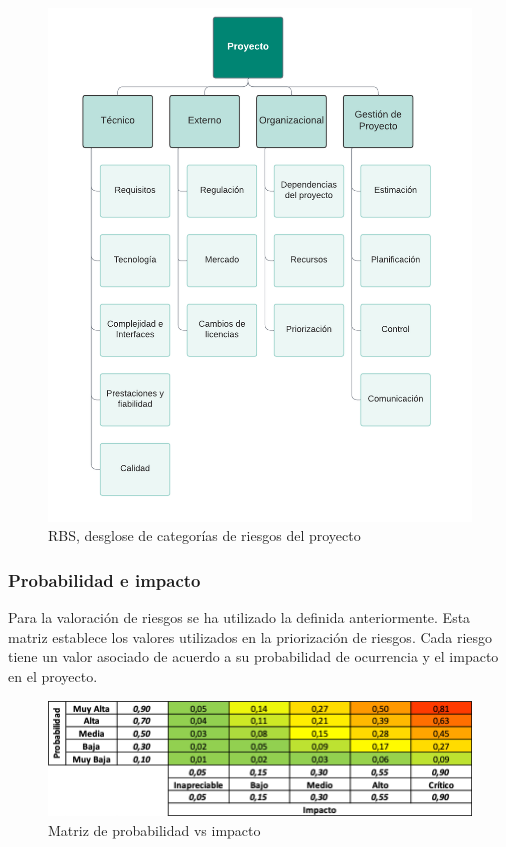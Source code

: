 \begin{figure}[H]
    \hypertarget{fig:A1_PGR_RBS}{}
    \centering
    \includegraphics[width=0.65\linewidth]{figures/A1_PGR_RBS.png}
    \caption{RBS, desglose de categorías de riesgos del proyecto}
    \label{fig:A1_PGR_RBS}
\end{figure}

\subsubsection*{Probabilidad e impacto}
Para la valoración de riesgos se ha utilizado la  definida anteriormente. 
Esta matriz establece los valores utilizados en la priorización de riesgos. Cada riesgo tiene un valor asociado de acuerdo a su probabilidad de ocurrencia y el impacto en el proyecto.

\begin{figure}[H]
    \hypertarget{fig:A1_PGR_matriz_prob_vs_impact}{}
    \centering
    \includegraphics{figures/A1_PGR_matriz_prob_vs_impact.png}
    \caption{Matriz de probabilidad vs impacto}
    \label{fig:A1_PGR_matriz_prob_vs_impact}
\end{figure}

